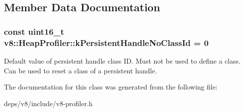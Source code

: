 \subsection{Member Data Documentation}
\hypertarget{classv8_1_1_heap_profiler_a272c9af3ea5cd90a2737af3d22a7eb78}{}
\subsubsection[{k\+Persistent\+Handle\+No\+Class\+Id}]{\setlength{\rightskip}{0pt plus 5cm}const uint16\+\_\+t v8\+::\+Heap\+Profiler\+::k\+Persistent\+Handle\+No\+Class\+Id = 0\hspace{0.3cm}{\ttfamily [static]}}\label{classv8_1_1_heap_profiler_a272c9af3ea5cd90a2737af3d22a7eb78}
Default value of persistent handle class I\+D. Must not be used to define a class. Can be used to reset a class of a persistent handle. 

The documentation for this class was generated from the following file\+:\begin{DoxyCompactItemize}
\item 
deps/v8/include/v8-\/profiler.\+h\end{DoxyCompactItemize}
